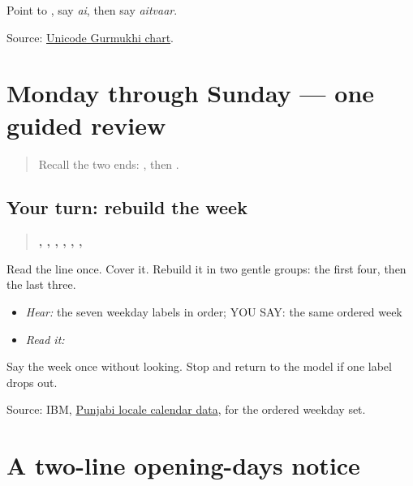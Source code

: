 \begin{tcolorbox}[breakable,colback=teal!4,colframe=teal!35!black,title={Before you move on}]
Point to \textbf{}, say \emph{ai}, then say \emph{aitvaar}.

Source: \href{https://www.unicode.org/charts/PDF/U0A00.pdf}{Unicode Gurmukhi chart}.
\end{tcolorbox}
\section[\texorpdfstring{\pa{ਸੋਮਵਾਰ} \pa{ਤੋਂ} \pa{ਐਤਵਾਰ} (somvaar ton aitvaar)}{ਸੋਮਵਾਰ ਤੋਂ ਐਤਵਾਰ (somvaar ton aitvaar)}]{Monday through Sunday — one guided review}

\label{lesson:PA-C182-weekday-review}



\begin{quote}
Recall the two ends: \textbf{}, then \textbf{}.
\end{quote}

\subsection*{Your turn: rebuild the week}
\begin{quote}
\textbf{, , , , , , }
\end{quote}

Read the line once. Cover it. Rebuild it in two gentle groups: the first four, then the last three.

\begin{itemize}
\raggedright
  \item \emph{Hear:} the seven weekday labels in order; YOU SAY: the same ordered week
  \item \emph{Read it:} \textbf{  }
\end{itemize}

\begin{tcolorbox}[breakable,colback=teal!4,colframe=teal!35!black,title={Before you move on}]
Say the week once without looking. Stop and return to the model if one label drops out.

Source: IBM, \href{https://public.dhe.ibm.com/software/globalization/documents/India-Punjabi\_Calendar.pdf}{Punjabi locale calendar data}, for the ordered weekday set.
\end{tcolorbox}
\section[\texorpdfstring{\pa{ਸੋਮਵਾਰ} \pa{ਤੋਂ} \pa{ਸ਼ੁੱਕਰਵਾਰ} … (somvaar ton …)}{ਸੋਮਵਾਰ ਤੋਂ ਸ਼ੁੱਕਰਵਾਰ … (somvaar ton …)}]{A two-line opening-days notice}

